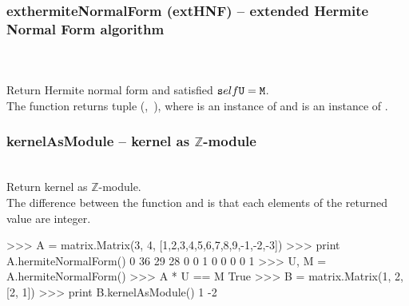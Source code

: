   \subsubsection{exthermiteNormalForm (extHNF) -- extended Hermite Normal Form algorithm}
   \\
   \\
   \spacing
   \quad Return Hermite normal form  and  satisfied ${\texttt self}{\texttt U}={\texttt M}$.\\
   \spacing
   \quad  The function returns tuple (,\ ), where  is an instance of  and  is an instance of .\\
  \subsubsection{kernelAsModule -- kernel as $\mathbb{Z}$-module}
   \\
   \spacing
   \quad Return kernel as $\mathbb{Z}$-module.\\
   \spacing
   \quad The difference between the function and  is that each elements of the returned value are integer.\\
   \spacing
\begin{ex}
>>> A = matrix.Matrix(3, 4, [1,2,3,4,5,6,7,8,9,-1,-2,-3])
>>> print A.hermiteNormalForm()
0 36 29 28
0  0  1  0
0  0  0  1
>>> U, M = A.hermiteNormalForm()
>>> A * U == M
True
>>> B = matrix.Matrix(1, 2, [2, 1])
>>> print B.kernelAsModule()
1
-2
\end{ex}
\C

